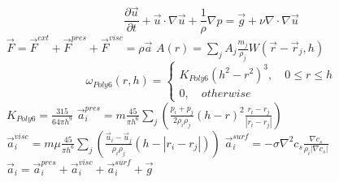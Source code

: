 $$\frac{\partial{\vec{u}}}{\partial{t}} + \vec{u} \cdot \nabla\vec{u} + \frac{1}{\rho}\nabla p = \vec{g} + \nu \nabla \cdot \nabla \vec{u}$$
$\vec{F} = \vec{F}^{ext} + \vec{F}^{pres} + \vec{F}^{visc} = \rho \vec{a}$
$A(r) = \sum_{j}{A_j \frac{m_j}{\rho_j} W(\vec{r} - \vec{r}_j, h)}$
$$\omega_{Poly6}(r, h) = \begin{cases}
    K_{Poly6}(h^2 - r^2)^3, \quad 0\le r \le h\\
    0, \quad otherwise \end{cases}$$
$K_{Poly6} = \frac{315}{64\pi h^9}$
$\vec{a}_i ^{pres} = m\frac{45}{\pi h^6}\sum_{j}(\frac{p_i + p_j}{2\rho _i \rho _j}(h-r)^2\frac{r_i - r_j}{|r_i - r_j|})$
$\vec{a}_i ^{visc} = m\mu\frac{45}{\pi h^6}\sum_{j}(\frac{\vec{u}_i - \vec{u}_j}{\rho_i \rho_j}(h - |r_i - r_j|))$
$\vec{a}_i ^{surf} = -\sigma\nabla ^2c_s \frac{\nabla c_s}{\rho_i |\nabla c_s|}$
$\vec{a}_i = \vec{a}_i^{pres} + \vec{a}_i^{visc} + \vec{a}_i^{surf} + \vec{g}$